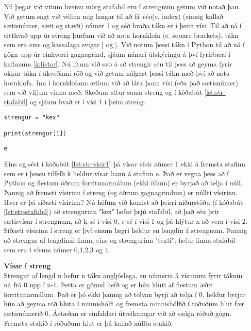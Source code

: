 Nú þegar við vitum hversu mörg stafabil eru í strengnum getum við notað þau.
Við getum sagt við vélina mig langar til að fá \emph{vísi}(e. index) (einnig kallað sætisnúmer, sæti og stæði) númer 1 og séð hvaða tákn er í þeim vísi.
Til að ná í eitthvað upp úr streng þurfum við að nota hornklofa (e. square brackets), tákn sem eru eins og kassalaga svigar [ og ].
Við notum þessi tákn í Python til að ná í gögn upp úr einhverri gagnagrind, sjáum nánari útskýringu á því fyrirbæri í kaflanum \ref{k:listar}.
Nú lítum við svo á að strengir séu til þess að geyma fyrir okkur tákn í ákveðinni röð og við getum nálgast þessi tákn með því að nota hornklofa.
Inn í hornklofann ætlum við að láta þann vísi (eða það sætisnúmer) sem við viljum vinna með.
Skoðum aftur sama streng og í kóðabút \ref{lst:str-stafabil} og sjáum hvað er í vísi 1 í þeim streng.
\begin{lstlisting}[caption=Vísir 1, label=lst:str-visir1]
strengur = "kex"

print(strengur[1])
\end{lstlisting}
\lstset{style=uttak}
\begin{lstlisting}
e
\end{lstlisting}
\lstset{style=venjulegt}

Eins og sést í kóðabút \ref{lst:str-visir1} þá vísar vísir númer 1 ekki á fremsta stafinn sem er í þessu tilfelli k heldur vísar hann á stafinn e.
Það er vegna þess að í Python og flestum öðrum forritunarmálum (ekki öllum) er byrjað að telja í núll.
Þannig að fremsti vísirinn í streng (og öðrum gagnagrindum) er núllti vísirinn.
Hver er þá síðasti vísirinn?
Nú höfum við komist að þeirri niðurstöðu (í kóðabút \ref{lst:str-stafabil}) að strengurinn "kex" hefur þrjú stafabil, að það séu þrír sætisvísar í strengnum, að k sé í vísi 0, e sé í vísi 1 og þá hlýtur x að vera í vísi 2.
Síðasti vísirinn í streng er því einum lægri heldur en lengdin á strengnum.
Þannig að strengur af lengdinni fimm, eins og strengurinn "texti", hefur fimm stafabil sem eru í vísum númer 0,1,2,3 og 4.

\begin{itarefni}
\textbf{Vísar í streng}\\
Strengur af lengd n hefur n tákn augljóslega, en númerin á vísunum fyrir táknin ná frá 0 upp í n-1.
Þetta er gömul hefð og er hún hluti af flestum æðri forritunarmálum.
Það er þó ekki þannig að tölvan byrji að telja í 0, heldur byrjar hún að geyma röð hluta í minnishólfi og fremsta minnishólfið í röðuðum hlut fær sætisnúmerið 0.
Ástæðan er einfaldari útreikningar við að sækja röðuð gögn.
Fremsta stakið í röðuðum hlut er þá kallað núllta stakið.
\end{itarefni}


